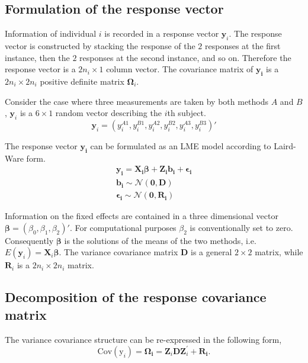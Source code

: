 \documentclass[MAIN.tex]{subfiles}
\begin{document}
\subsection{Formulation of the response vector}
Information of individual $i$ is recorded in a response vector $\boldsymbol{y}_{i}$. The response vector is constructed by stacking the response of the $2$ responses at the first instance, then the $2$ responses at the second instance, and so on. Therefore the response vector is a $2n_{i} \times 1$ column vector.
The covariance matrix of $\boldsymbol{y_{i}}$ is a $2n_{i} \times 2n_{i}$ positive definite matrix $\boldsymbol{\Omega}_{i}$.

Consider the case where three measurements are taken by both methods $A$ and $B$, $\boldsymbol{y}_{i}$ is a $6 \times 1$ random vector describing the $i$th subject.
\[
\boldsymbol{y}_{i} = (y_{i}^{A1},y_{i}^{B1},y_{i}^{A2},y_{i}^{B2},y_{i}^{A3},y_{i}^{B3}) \prime
\]

The response vector $\boldsymbol{y_{i}}$ can be formulated as an LME model according to Laird-Ware form.
\begin{eqnarray*}
	\boldsymbol{y_{i}} = \boldsymbol{X_{i}\beta}  + \boldsymbol{Z_{i}b_{i}} + \boldsymbol{\epsilon_{i}}\\
	\boldsymbol{b_{i}} \sim \mathcal{N}(\boldsymbol{0,D})\\
	\boldsymbol{\epsilon_{i}} \sim \mathcal{N}(\boldsymbol{0,R_{i}})
\end{eqnarray*}

Information on the fixed effects are contained in a three dimensional vector $\boldsymbol{\beta} = (\beta_{0},\beta_{1},\beta_{2})\prime$. For computational purposes $\beta_{2}$ is conventionally set to zero. Consequently $\boldsymbol{\beta}$ is the solutions of the means of the two methods, i.e. $E(\boldsymbol{y}_{i})  = \boldsymbol{X}_{i}\boldsymbol{\beta}$. The variance covariance matrix $\boldsymbol{D}$ is a general $2 \times 2$ matrix, while $\boldsymbol{R}_{i}$ is a $2n_{i} \times 2n_{i}$ matrix.

\subsection{Decomposition of the response covariance matrix}

The variance covariance structure can be re-expressed in the following form,
\[
\mbox{Cov}(\mbox{y}_{i}) = \boldsymbol{\Omega_{i}} = \boldsymbol{Z}_{i}\boldsymbol{D}\boldsymbol{Z}_{i}^\prime + \boldsymbol{R_{i}}.
\]
\end{document}
